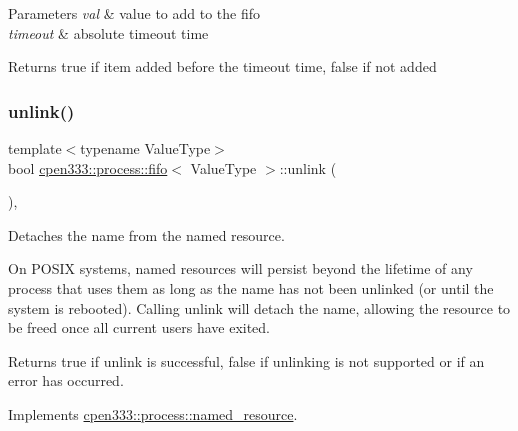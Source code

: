 \begin{DoxyParams}{Parameters}
{\em val} & value to add to the fifo \\
\hline
{\em timeout} & absolute timeout time \\
\hline
\end{DoxyParams}
\begin{DoxyReturn}{Returns}
{\ttfamily true} if item added before the timeout time, {\ttfamily false} if not added 
\end{DoxyReturn}
\mbox{\label{classcpen333_1_1process_1_1fifo_a85f9c252de8044d57568e99b64cbb860}} 
\subsubsection{\texorpdfstring{unlink()}{unlink()}\hspace{0.1cm}{\footnotesize\ttfamily [1/2]}}
{\footnotesize\ttfamily template$<$typename Value\+Type$>$ \\
bool \hyperlink{classcpen333_1_1process_1_1fifo}{cpen333\+::process\+::fifo}$<$ Value\+Type $>$\+::unlink (\begin{DoxyParamCaption}{ }\end{DoxyParamCaption})\hspace{0.3cm}{\ttfamily [inline]}, {\ttfamily [virtual]}}



Detaches the name from the named resource. 

On P\+O\+S\+IX systems, named resources will persist beyond the lifetime of any process that uses them as long as the name has not been unlinked (or until the system is rebooted). Calling {\ttfamily unlink} will detach the name, allowing the resource to be freed once all current users have exited.

\begin{DoxyReturn}{Returns}
{\ttfamily true} if unlink is successful, {\ttfamily false} if unlinking is not supported or if an error has occurred. 
\end{DoxyReturn}


Implements \hyperlink{classcpen333_1_1process_1_1named__resource_a5d33168fee48c9b0c58ab8fd96e230ce}{cpen333\+::process\+::named\+\_\+resource}.

\mbox{\label{classcpen333_1_1process_1_1fifo_a893a14908a88de202fe2804dd890f958}} 
